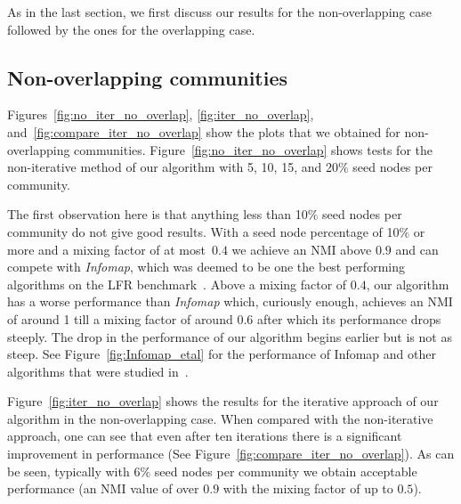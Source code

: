 \newcommand{\plotwidth}{0.63\linewidth}
\newcommand{\cfinderwidth}{0.96\linewidth}
\newcommand{\otherplotswidth}{0.76\linewidth}

As in the last section, we first discuss our results for the non-overlapping case followed by 
the ones for the overlapping case.

\subsection{Non-overlapping communities}
Figures~\ref{fig:no_iter_no_overlap}, \ref{fig:iter_no_overlap}, and~\ref{fig:compare_iter_no_overlap}
show the plots that we obtained for non-overlapping communities. Figure~\ref{fig:no_iter_no_overlap}
shows tests for the non-iterative method of our algorithm with 5, 10, 15, and 20$\%$ seed nodes per 
community. 

The first observation here is that anything less than 10$\%$ seed nodes per community 
do not give good results. With a seed node percentage of 10$\%$ or more and 
a mixing factor of at most~$0.4$ we achieve an NMI above $0.9$ and can compete with \textit{Infomap}, 
which was deemed to be one the best performing algorithms on the LFR benchmark~\cite{LF09}. 
Above a mixing factor of $0.4$, our algorithm has a worse performance than \textit{Infomap} 
which, curiously enough, achieves an NMI of around 1 till a mixing factor of around 
$0.6$ after which its performance drops steeply. The drop in the performance of our algorithm 
begins earlier but is not as steep. See Figure~\ref{fig:Infomap_etal} for the performance 
of Infomap and other algorithms that were studied in~\cite{LF09}. 

Figure~\ref{fig:iter_no_overlap} shows the results for the iterative approach of 
our algorithm in the non-overlapping case. When compared with the non-iterative approach, 
one can see that even after ten iterations there is a significant improvement in 
performance (See Figure~\ref{fig:compare_iter_no_overlap}). As can be seen, typically 
with 6$\%$ seed nodes per community we obtain acceptable performance (an NMI value of 
over $0.9$ with the mixing factor of up to $0.5$).  


